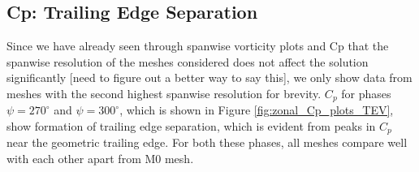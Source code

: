 \subsection{Cp: Trailing Edge Separation}


Since we have already seen through spanwise vorticity plots and Cp that the spanwise resolution of the meshes considered does not affect the solution significantly [need to figure out a better way to say this], we only show data from meshes with the second highest spanwise resolution for brevity. $C_p$ for phases $\psi=270^\circ$ and $\psi=300^\circ$, which is shown in Figure \ref{fig:zonal_Cp_plots_TEV}, show formation of trailing edge separation, which is evident from peaks in $C_p$ near the geometric trailing edge. For both these phases, all meshes compare well with each other apart from M0 mesh.


